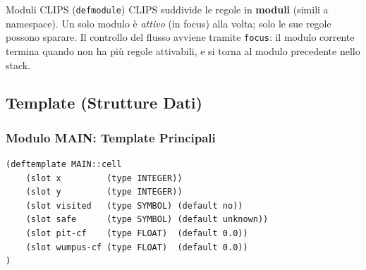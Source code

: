 \documentclass[12pt,a4paper]{article}
\begin{document}
\begin{defbox}{Moduli CLIPS (\texttt{defmodule})}
CLIPS suddivide le regole in \textbf{moduli} (simili a namespace). Un solo
modulo è \emph{attivo} (in focus) alla volta; solo le sue regole possono
sparare. Il controllo del flusso avviene tramite \texttt{focus}: il modulo
corrente termina quando non ha più regole attivabili, e si torna al modulo
precedente nello stack.
\end{defbox}

\begin{center}
\end{center}

\subsection{Template (Strutture Dati)}

\subsubsection{Modulo MAIN: Template Principali}

\begin{lstlisting}
(deftemplate MAIN::cell
    (slot x         (type INTEGER))
    (slot y         (type INTEGER))
    (slot visited   (type SYMBOL) (default no))
    (slot safe      (type SYMBOL) (default unknown))
    (slot pit-cf    (type FLOAT)  (default 0.0))
    (slot wumpus-cf (type FLOAT)  (default 0.0))
)
\end{lstlisting}
\end{document}
